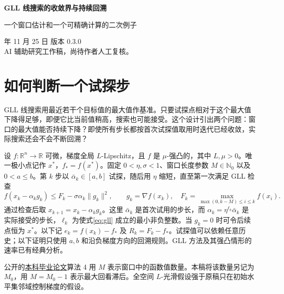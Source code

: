 \documentclass[11pt,a4paper,UTF8,fontset=fandol]{ctexart}
\begin{document}
\begin{center}
{\LARGE\bfseries GLL 线搜索的收敛界与持续回溯\par}
\smallskip
{\large 一个窗口估计和一个可精确计算的二次例子\par}
 年 11 月 25 日 \quad 版本 0.3.0\\
\small AI 辅助研究工作稿，尚待作者人工复核。
\end{center}
\begin{abstract}
GLL 线搜索以最近若干个目标值的最大值为参考，允许单步目标值上升。对全局光滑的强凸函数，只要首次试探步长具有正下界和有限上界，实际接受点就具有几何收敛界。本文分别估计充分下降和单步最大增长，再将两条不等式合并。一个一维二次例子进一步说明，即使只用首次试探步长的迭代每周期缩小一半，实际线搜索仍可以在每周期末缩短一次步长。
\end{abstract}

\section{如何判断一个试探步}
GLL 线搜索用最近若干个目标值的最大值作基准。只要试探点相对于这个最大值下降得足够，即便它比当前值稍高，搜索也可能接受。这个设计引出两个问题：窗口的最大值能否持续下降？即使所有步长都按首次试探值取用时迭代已经收敛，实际搜索还会不会不断回溯？

设 \(f:\mathbb{R}^n\to\mathbb{R}\) 可微，梯度全局 \(L\)-Lipschitz，且 \(f\) 是 \(\mu\)-强凸的，其中 \(L,\mu>0\)。唯一极小点记作 \(x^*\)，\(f_*=f(x^*)\)。固定 \(0<\eta,\sigma<1\)、窗口长度参数 \(M\in\mathbb{N}_0\) 以及 \(0<a\le b\)。第 \(k\) 步以 \(\bar\alpha_k\in[a,b]\) 试探，随后用 \(\eta\) 缩短，直至第一次满足 GLL 检查
\begin{equation}\label{eq:gll}
 f(x_k-\alpha_k g_k) \le F_k-\sigma\alpha_k\|g_k\|^2,\qquad
 g_k=\nabla f(x_k),\quad F_k=\max_{\max(0,k-M)\le i\le k}f(x_i).
\end{equation}
通过检查后取 \(x_{k+1}=x_k-\alpha_k g_k\)。这里 \(\bar\alpha_k\) 是首次试用的步长，而 \(\alpha_k=\eta^{\ell_k}\bar\alpha_k\) 是实际接受的步长，\(\ell_k\) 为使式\eqref{eq:gll} 成立的最小非负整数。当 \(g_k=0\) 时可令后续点恒为 \(x^*\)。以下记 \(e_k=f(x_k)-f_*\) 及 \(R_k=F_k-f_*\)。试探值可以依赖任意历史；以下证明只使用 \(a,b\) 和沿负梯度方向的回溯规则。GLL 方法及其强凸情形的速率已有经典分析\cite{gll,dai,zh}。

公开的\href{https://taitai2025.github.io/assets/documents/undergraduate-thesis.pdf}{本科毕业论文}算法 4 用 \(M\) 表示窗口中的函数值数量。本稿将该数量另记为 \(M_0\)，用 \(M=M_0-1\) 表示最大回看滞后。全空间 \(L\)-光滑假设强于原稿只在初始水平集邻域控制梯度的假设。
\end{document}
